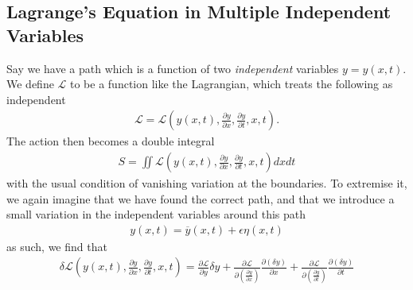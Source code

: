 \documentclass[a4paper]{article}
\begin{document}
    \subsection{Lagrange's Equation in Multiple Independent Variables}
    Say we have a path which is a function of two \textit{independent} variables \(y = y(x, t)\). We define \(\mathcal{L} \) to be a function like the Lagrangian, which treats the following as independent \begin{align*}
        \mathcal{L} = \mathcal{L} \left(y(x,t), \frac{\partial y}{\partial x}, \frac{\partial y}{\partial t}, x, t\right).
    \end{align*}
    The action then becomes a double integral \begin{align*}
        S = \iint \mathcal{L} \left(y(x,t), \frac{\partial y}{\partial x}, \frac{\partial y}{\partial t}, x, t\right) dx dt
    \end{align*}
    with the usual condition of vanishing variation at the boundaries. 
    To extremise it, we again imagine that we have found the correct path, and that we introduce a small variation in the independent variables around this path
    \begin{align*}
        y(x, t) = \overline{y}(x, t) + \epsilon \eta(x, t)
    \end{align*}
    as such, we find that \begin{align*}
        \delta \mathcal{L} \left(y(x,t), \frac{\partial y}{\partial x}, \frac{\partial y}{\partial t}, x, t\right) = \frac{\partial \mathcal{L}}{\partial y} \delta y + \frac{\partial \mathcal{L}}{\partial \left( \frac{\partial y}{\partial x}  \right)}\frac{\partial (\delta y)}{\partial x} + \frac{\partial \mathcal{L}}{\partial \left( \frac{\partial y}{\partial t}  \right)}\frac{\partial (\delta y)}{\partial t} 
    \end{align*}
\end{document}
